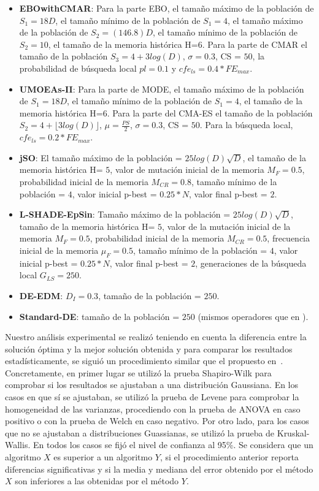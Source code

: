 \begin{itemize}
\item \textbf{EBOwithCMAR}: Para la parte EBO, el tamaño máximo de la población de $S_1 = 18D$, 
el tamaño mínimo de la población de $S_1 = 4$, el tamaño máximo de la población de $S_2 = (146.8)D$, 
el tamaño mínimo de la población de $S_2 = 10$, el tamaño de la memoria histórica H=$6$. 
Para la parte de CMAR el tamaño de la población $S_3 = 4 + 3log(D)$, $\sigma=0.3$, CS = $50$, 
la probabilidad de búsqueda local $pl = 0.1$ y $cfe_{ls} = 0.4* FE_{max}$.
\item \textbf{UMOEAs-II}: Para la parte de MODE, el tamaño máximo de la población de $S_1 = 18D$, el tamaño mínimo de la población de $S_1 = 4$, 
el tamaño de la memoria histórica H=$6$. Para la parte del CMA-ES el tamaño de la población $S_2 = 4 + \lfloor 3log(D) \rfloor$, $\mu=\frac{PS}{2}$, 
$\sigma=0.3$, CS = $50$. Para la búsqueda local, $cfe_{ls} = 0.2 * FE_{max}$.
\item \textbf{jSO}: El tamaño máximo de la población = $25log(D)\sqrt{D}$, el tamaño de la memoria histórica H= $5$, 
valor de mutación inicial de la memoria $M_F = 0.5$, probabilidad inicial de la memoria $M_{CR} = 0.8$, 
tamaño mínimo de la población = $4$, valor inicial p-best = $0.25*N$, valor final p-best = $2$.
\item \textbf{L-SHADE-EpSin}: Tamaño máximo de la población = $25log(D)\sqrt{D}$, tamaño de la memoria histórica H= $5$, 
valor de la mutación inicial de la memoria $M_F = 0.5$, probabilidad inicial de la memoria $M_{CR} = 0.5$, frecuencia inicial de la memoria $\mu_F = 0.5$, 
tamaño mínimo de la población = $4$, valor inicial p-best = $0.25*N$, valor final p-best = $2$, generaciones de la búsqueda local $G_{LS}=250$.
\item \textbf{DE-EDM}: $D_I = 0.3$, tamaño de la población = $250$.
\item \textbf{Standard-DE}: tamaño de la población = $250$ (mismos operadores que en \DEEDM{}).
\end{itemize}
%

Nuestro análisis experimental se realizó teniendo en cuenta la diferencia entre la solución óptima y la mejor solución obtenida
y para comparar los resultados estadísticamente, se siguió un procedimiento similar que el propuesto en~\cite{Joel:StatisticalTest}.
%
Concretamente, en primer lugar se utilizó la prueba Shapiro-Wilk para comprobar si los resultados se ajustaban a una distribución Gaussiana. 
%
En los casos en que sí se ajustaban, se utilizó la prueba de Levene para comprobar la homogeneidad de las varianzas, procediendo con la prueba de 
ANOVA en caso positivo o con la prueba de Welch en caso negativo.
%
Por otro lado, para los casos que no se ajustaban a distribuciones Guassianas, se utilizó la prueba de Kruskal-Wallis.
%
En todos los casos se fijó el nivel de confianza al 95\%.
%
Se considera que un algoritmo $X$ es superior a un algoritmo $Y$, si el procedimiento anterior reporta diferencias significativas y si la media y mediana 
del error obtenido por el método $X$ son inferiores a las obtenidas por el método $Y$.

